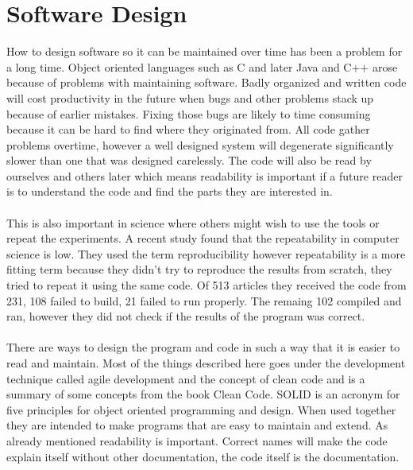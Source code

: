 \documentclass[10pt,a4paper]{report}
\begin{document}
\clearpage
\section{Software Design}
How to design software so it can be maintained over time has been a problem for a long time. Object oriented languages such as C and later Java and C++ arose because of problems with maintaining software. Badly organized and written code will cost productivity in the future when bugs and other problems stack up because of earlier mistakes. Fixing those bugs are likely to time consuming because it can be hard to find where they originated from. All code gather problems overtime, however a well designed system will degenerate significantly slower than one that was designed carelessly. The code will also be read by ourselves and others later which means readability is important if a future reader is to understand the code and find the parts they are interested in. \cite{cleancode2008, design_patterns}\\
\\
This is also important in science where others might wish to use the tools or repeat the experiments. A recent study\cite{comp_repro_2013} found that the repeatability in computer science is low. They used the term reproducibility however repeatability is a more fitting term because they didn't try to reproduce the results from scratch, they tried to repeat it using the same code. Of 513 articles they received the code from 231, 108 failed to build, 21 failed to run properly\cite{comp_repro_2013}. The remaing 102 compiled and ran, however they did not check if the results of the program was correct\cite{comp_repro_2013}.\\
\\
There are ways to design the program and code in such a way that it is easier to read and maintain. Most of the things described here goes under the development technique called agile development and the concept of clean code and is a summary of some concepts from the book Clean Code\cite{cleancode2008}. SOLID is an acronym for five principles for object oriented programming and design\cite{cleancode2008}. When used together they are intended to make programs that are easy to maintain and extend\cite{cleancode2008}. As already mentioned readability is important. Correct names will make the code explain itself without other documentation, the code itself is the documentation\cite{cleancode2008}.
\end{document}
